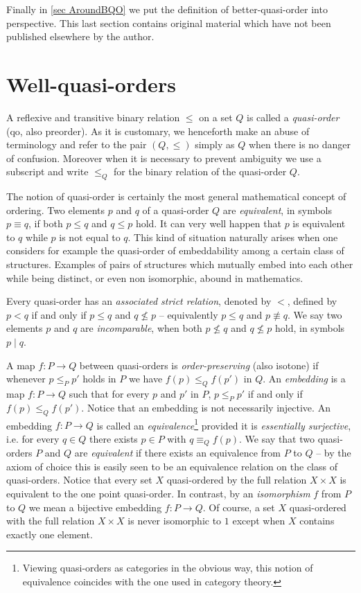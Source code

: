 \documentclass{article}%
\theoremstyle{plain}
\theoremstyle{definition}
\theoremstyle{remark}
\newcommand{\incomp}{\mathbin{|}}
\begin{document}
Finally in \cref{sec AroundBQO} we put the definition of better-quasi-order into perspective. This last section contains original material which have not been published elsewhere by the author.

\section{Well-quasi-orders}\label{sec WQO}

A reflexive and transitive binary relation $\leq$ on a set $Q$ is called a \emph{quasi-order} (qo, also preorder). As it is customary, we henceforth make an abuse of terminology and refer to the pair $(Q,\leq)$ simply as $Q$ when there is no danger of confusion. Moreover when it is necessary to prevent ambiguity we use a subscript and write $\leq_{Q}$ for the binary relation of the quasi-order $Q$.

The notion of quasi-order is certainly the most general mathematical concept of ordering. Two elements $p$ and $q$ of a quasi-order $Q$ are \emph{equivalent}, in symbols $p\equiv q$, if both $p\leq q$ and $q\leq p$ hold. It can very well happen that $p$ is equivalent to $q$ while $p$ is not equal to $q$. This kind of situation naturally arises when one considers for example the quasi-order of embeddability among a certain class of structures. Examples of pairs of structures which mutually embed into each other while being distinct, or even non isomorphic, abound in mathematics.

Every quasi-order has an \emph{associated strict relation}, denoted by $<$, defined by $p<q$ if and only if $p\leq q$ and $q\nleq p$ -- equivalently $p\leq q$ and $p\not\equiv q$. We say two elements $p$ and $q$ are \emph{incomparable}, when both $p\nleq q$ and $q\nleq p$ hold, in symbols $p\incomp q$.

A map $f:P\to Q$ between quasi-orders is \emph{order-preserving} (also isotone) if whenever $p\leq_{P} p'$ holds in $P$ we have $f(p)\leq_{Q} f(p')$ in $Q$. An \emph{embedding} is a map $f:P\to Q$ such that for every $p$ and $p'$ in $P$, $p\leq_{P} p'$ if and only if $f(p)\leq_{Q}f(p')$. Notice that an embedding is not necessarily injective.  An embedding $f:P\to Q$ is called an \emph{equivalence}\footnote{Viewing quasi-orders as categories in the obvious way, this notion of equivalence coincides with the one used in category theory.} provided it is \emph{essentially surjective}, i.e. for every $q\in Q$ there exists $p\in P$ with $q\equiv_{Q} f(p)$. We say that two quasi-orders $P$ and $Q$ are \emph{equivalent} if there exists an equivalence from $P$ to $Q$ -- by the axiom of choice this is easily seen to be an equivalence relation on the class of quasi-orders. Notice that every set $X$ quasi-ordered by the full relation $X\times X$ is equivalent to the one point quasi-order. In contrast, by an \emph{isomorphism} $f$ from $P$ to $Q$ we mean a bijective embedding $f:P\to Q$. 
Of course, a set $X$ quasi-ordered with the full relation $X\times X$ is never isomorphic to $1$ except when $X$ contains exactly one element.
\end{document}
